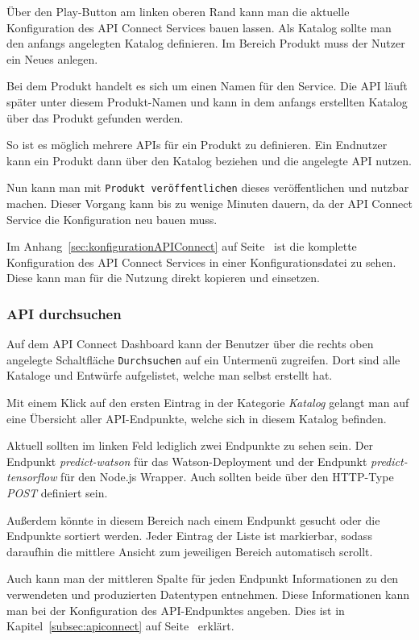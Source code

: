 Über den Play-Button am linken oberen Rand kann man die aktuelle Konfiguration des API Connect Services bauen lassen.
Als Katalog sollte man den anfangs angelegten Katalog definieren. Im Bereich Produkt muss der Nutzer ein Neues anlegen.

Bei dem Produkt handelt es sich um einen Namen für den Service. Die API läuft später unter diesem Produkt-Namen und
kann in dem anfangs erstellten Katalog über das Produkt gefunden werden.

So ist es möglich mehrere APIs für ein Produkt zu definieren. Ein Endnutzer kann ein Produkt dann über den Katalog
beziehen und die angelegte API nutzen.

Nun kann man mit \texttt{Produkt veröffentlichen} dieses veröffentlichen und nutzbar machen. Dieser Vorgang kann bis zu
wenige Minuten dauern, da der API Connect Service die Konfiguration neu bauen muss.

Im Anhang~\ref{sec:konfigurationAPIConnect} auf Seite~\pageref{sec:konfigurationAPIConnect} ist die komplette
Konfiguration des API Connect Services in einer Konfigurationsdatei zu sehen. Diese kann man für die Nutzung direkt
kopieren und einsetzen.

\subsubsection{API durchsuchen}
Auf dem API Connect Dashboard kann der Benutzer über die rechts oben angelegte Schaltfläche \texttt{Durchsuchen} auf ein
Untermenü zugreifen. Dort sind alle Kataloge und Entwürfe aufgelistet, welche man selbst erstellt hat.

Mit einem Klick auf den ersten Eintrag in der Kategorie \textit{Katalog} gelangt man auf eine Übersicht aller
API-Endpunkte, welche sich in diesem Katalog befinden.

Aktuell sollten im linken Feld lediglich zwei Endpunkte zu sehen sein. Der Endpunkt \textit{predict-watson} für das
Watson-Deployment und der Endpunkt \textit{predict-tensorflow} für den Node.js Wrapper. Auch sollten beide über
den HTTP-Type \textit{POST} definiert sein.

Außerdem könnte in diesem Bereich nach einem Endpunkt gesucht oder die Endpunkte sortiert werden. Jeder Eintrag der
Liste ist markierbar, sodass daraufhin die mittlere Ansicht zum jeweiligen Bereich automatisch scrollt.

Auch kann man der mittleren Spalte für jeden Endpunkt Informationen zu den verwendeten und produzierten Datentypen
entnehmen. Diese Informationen kann man bei der Konfiguration des API-Endpunktes angeben. Dies ist in
Kapitel~\ref{subsec:apiconnect} auf Seite~\pageref{subsec:apiconnect} erklärt.

